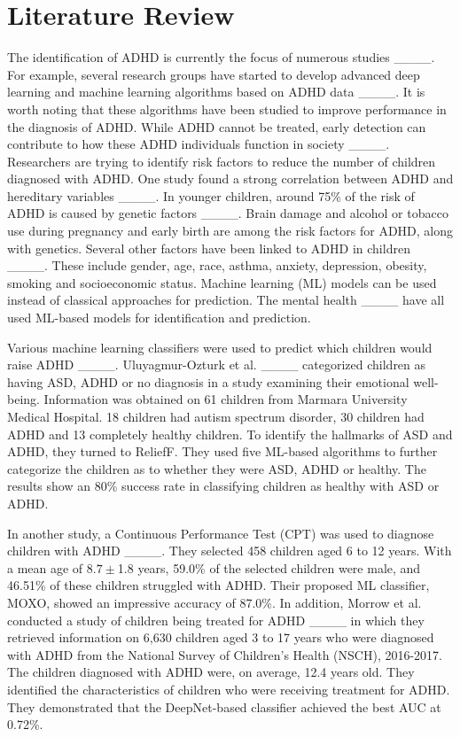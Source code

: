 \section{Literature Review}
\label{lr}
The identification of ADHD is currently the focus of numerous studies ____. For example, several research groups have started to develop advanced deep learning and machine learning algorithms based on ADHD data ____. It is worth noting that these algorithms have been studied to improve performance in the diagnosis of ADHD. While ADHD cannot be treated, early detection can contribute to how these ADHD individuals function in society ____. Researchers are trying to identify risk factors to reduce the number of children diagnosed with ADHD. One study found a strong correlation between ADHD and hereditary variables ____. In younger children, around 75\% of the risk of ADHD is caused by genetic factors ____. Brain damage and alcohol or tobacco use during pregnancy and early birth are among the risk factors for ADHD, along with genetics. Several other factors have been linked to ADHD in children ____. These include gender, age, race, asthma, anxiety, depression, obesity, smoking and socioeconomic status. Machine learning (ML) models can be used instead of classical approaches for prediction. The mental health ____ have all used ML-based models for identification and prediction.

Various machine learning classifiers were used to predict which children would raise ADHD ____. Uluyagmur-Ozturk et al. ____ categorized children as having ASD, ADHD or no diagnosis in a study examining their emotional well-being. Information was obtained on 61 children from Marmara University Medical Hospital. 18 children had autism spectrum disorder, 30 children had ADHD and 13 completely healthy children. To identify the hallmarks of ASD and ADHD, they turned to ReliefF. They used five ML-based algorithms to further categorize the children as to whether they were ASD, ADHD or healthy. The results show an 80\% success rate in classifying children as healthy with ASD or ADHD.

In another study, a Continuous Performance Test (CPT) was used to diagnose children with ADHD ____. They selected 458 children aged 6 to 12 years. With a mean age of $8.7\pm$1.8 years, 59.0\% of the selected children were male, and 46.51\% of these children struggled with ADHD. Their proposed ML classifier, MOXO, showed an impressive accuracy of 87.0\%.
%
In addition, Morrow et al. conducted a study of children being treated for ADHD ____ in which they retrieved information on 6,630 children aged 3 to 17 years who were diagnosed with ADHD from the National Survey of Children's Health (NSCH), 2016-2017. The children diagnosed with ADHD were, on average, 12.4 years old. They identified the characteristics of children who were receiving treatment for ADHD. They demonstrated that the DeepNet-based classifier achieved the best AUC at 0.72\%.


